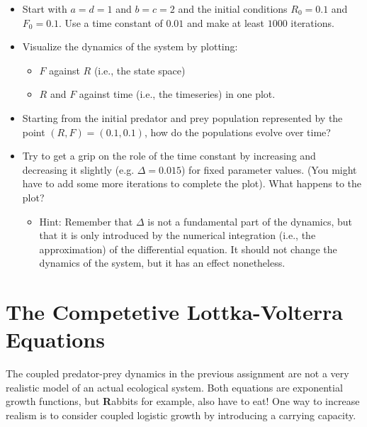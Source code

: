 \documentclass[]{book}
\providecommand{\tightlist}{%
  \setlength{\itemsep}{0pt}\setlength{\parskip}{0pt}}
\let\stdsection\section
\renewcommand\section{\newpage\stdsection}
\begin{document}
\begin{itemize}
\tightlist
\item
  Start with \(a = d = 1\) and \(b = c = 2\) and the initial conditions
  \(R_0 = 0.1\) and \(F_0 = 0.1\). Use a time constant of \(0.01\) and
  make at least \(1000\) iterations.
\item
  Visualize the dynamics of the system by plotting:

  \begin{itemize}
  \tightlist
  \item
    \(F\) against \(R\) (i.e., the state space)
  \item
    \(R\) and \(F\) against time (i.e., the timeseries) in one plot.
  \end{itemize}
\item
  Starting from the initial predator and prey population represented by
  the point \((R, F) = (0.1, 0.1)\), how do the populations evolve over
  time?
\item
  Try to get a grip on the role of the time constant by increasing and
  decreasing it slightly (e.g. \(\Delta = 0.015\)) for fixed parameter
  values. (You might have to add some more iterations to complete the
  plot). What happens to the plot?

  \begin{itemize}
  \tightlist
  \item
    Hint: Remember that \(\Delta\) is not a fundamental part of the
    dynamics, but that it is only introduced by the numerical
    integration (i.e., the approximation) of the differential equation.
    It should not change the dynamics of the system, but it has an
    effect nonetheless.
  \end{itemize}
\end{itemize}

\section{\texorpdfstring{\textbf{The Competetive Lottka-Volterra
Equations}}{The Competetive Lottka-Volterra Equations}}\label{the-competetive-lottka-volterra-equations}

The coupled predator-prey dynamics in the previous assignment are not a
very realistic model of an actual ecological system. Both equations are
exponential growth functions, but \textbf{R}abbits for example, also
have to eat! One way to increase realism is to consider coupled logistic
growth by introducing a carrying capacity.
\end{document}
